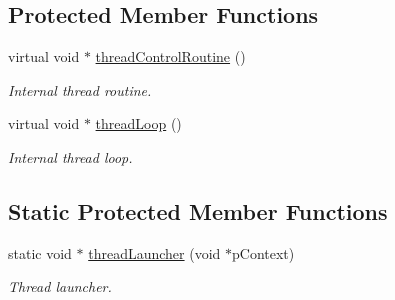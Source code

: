 \subsection*{Protected Member Functions}
\begin{DoxyCompactItemize}
\item 
virtual void $\ast$ \hyperlink{classPThreadClass_a012fe659b15bb0c0c19125ee0d1fa94e}{thread\+Control\+Routine} ()
\begin{DoxyCompactList}\small\item\em Internal thread routine. \end{DoxyCompactList}\item 
virtual void $\ast$ \hyperlink{classPThreadClass_a77732762f14058291d35bdbbc49018c6}{thread\+Loop} ()
\begin{DoxyCompactList}\small\item\em Internal thread loop. \end{DoxyCompactList}\end{DoxyCompactItemize}
\subsection*{Static Protected Member Functions}
\begin{DoxyCompactItemize}
\item 
static void $\ast$ \hyperlink{classPThreadClass_a0639ba7f95bfe914271a2fe4b61003b1}{thread\+Launcher} (void $\ast$p\+Context)
\begin{DoxyCompactList}\small\item\em Thread launcher. \end{DoxyCompactList}\end{DoxyCompactItemize}
